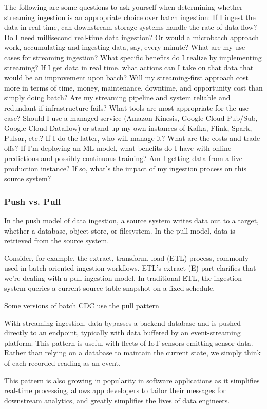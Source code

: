 \documentclass[12pt]{book}
\begin{document}
The following are some questions to ask yourself when determining whether
streaming ingestion is an appropriate choice over batch ingestion:
If I ingest the data in real time, can downstream storage systems
handle the rate of data flow?
Do I need millisecond real-time data ingestion? Or would a microbatch
approach work, accumulating and ingesting data, say, every
minute?
What are my use cases for streaming ingestion? What specific benefits
do I realize by implementing streaming? If I get data in real time, what
actions can I take on that data that would be an improvement upon
batch?
Will my streaming-first approach cost more in terms of time, money,
maintenance, downtime, and opportunity cost than simply doing
batch?
Are my streaming pipeline and system reliable and redundant if
infrastructure fails?
What tools are most appropriate for the use case? Should I use a
managed service (Amazon Kinesis, Google Cloud Pub/Sub, Google
Cloud Dataflow) or stand up my own instances of Kafka, Flink, Spark,
Pulsar, etc.? If I do the latter, who will manage it? What are the costs
and trade-offs?
If I’m deploying an ML model, what benefits do I have with online
predictions and possibly continuous training?
Am I getting data from a live production instance? If so, what’s the
impact of my ingestion process on this source system?
\subsubsection{Push vs. Pull}
In the push model of data ingestion, a source system writes data out to a
target, whether a database, object store, or filesystem. In the pull model,
data is retrieved from the source system.

Consider, for example, the extract, transform, load (ETL) process,
commonly used in batch-oriented ingestion workflows. ETL’s extract (E)
part clarifies that we're dealing with a pull ingestion model. In traditional
ETL, the ingestion system queries a current source table snapshot on a fixed
schedule.

Some versions of batch CDC use the pull pattern

With streaming ingestion, data bypasses a backend database and is pushed
directly to an endpoint, typically with data buffered by an event-streaming
platform. This pattern is useful with fleets of IoT sensors emitting sensor
data. Rather than relying on a database to maintain the current state, we
simply think of each recorded reading as an event.

This pattern is also growing in popularity in software applications as it simplifies real-time
processing, allows app developers to tailor their messages for downstream
analytics, and greatly simplifies the lives of data engineers.
\end{document}
